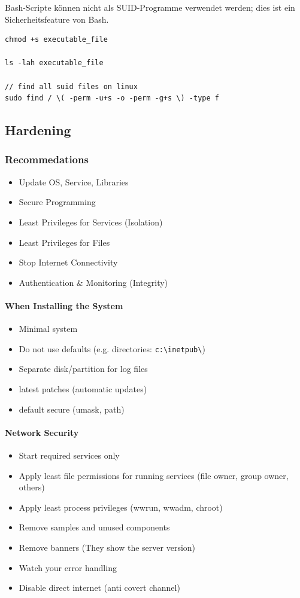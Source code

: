 Bash-Scripte können nicht als SUID-Programme verwendet werden; dies ist ein Sicherheitsfeature von Bash.

\begin{lstlisting}
chmod +s executable_file

ls -lah executable_file

// find all suid files on linux
sudo find / \( -perm -u+s -o -perm -g+s \) -type f
\end{lstlisting}

\subsection{Hardening}

\subsubsection{Recommedations}
\begin{itemize}
	\item Update OS, Service, Libraries
	\item Secure Programming
	\item Least Privileges for Services (Isolation)
	\item Least Privileges for Files
	\item Stop Internet Connectivity
	\item Authentication \& Monitoring (Integrity)
\end{itemize}

\paragraph{When Installing the System}
\begin{itemize}
	\item Minimal system
	\item Do not use defaults (e.g. directories: \lstinline|c:\inetpub\|)
	\item Separate disk/partition for log files
	\item latest patches (automatic updates)
	\item default secure (umask, path)
\end{itemize}

\paragraph{Network Security}
\begin{itemize}
	\item Start required services only
	\item Apply least file permissions for running services (file owner, group owner, others)
	\item Apply least process privileges (wwrun, wwadm, chroot)
	\item Remove samples and unused components
	\item Remove banners (They show the server version)
	\item Watch your error handling
	\item Disable direct internet (anti covert channel)
\end{itemize}

